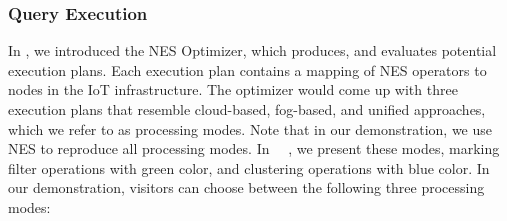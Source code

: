 % 
\subsubsection{Query Execution}
% 
In , we introduced the NES Optimizer, which produces, and evaluates potential execution plans.
Each execution plan contains a mapping of NES operators to nodes in the IoT infrastructure.
The optimizer would come up with three execution plans that resemble cloud-based, fog-based, and unified approaches, which we refer to as processing modes.
Note that in our demonstration, we use NES to reproduce all processing modes.
% 
In ~~, we present these modes, marking filter operations with green color, and clustering operations with blue color.
In our demonstration, visitors can choose between the following three processing modes:

